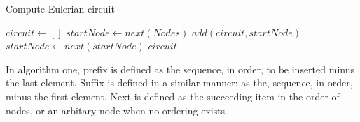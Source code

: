 \documentclass[letterpaper, 10 pt]{ieeeconf}
\begin{document}
  \begin{algorithm}
    \caption{Compute Eulerian circuit}
    \begin{algorithmic}
      \STATE $circuit \leftarrow []$
        \STATE $startNode \leftarrow next(Nodes)$
          \STATE $add(circuit, startNode)$
          \STATE $startNode \leftarrow next(startNode)$
        \ENDWHILE
      \ENDIF
      \RETURN $circuit$
    \end{algorithmic}
  \end{algorithm}

  In algorithm one, prefix is defined as the sequence, in order, to be inserted
  minus the last element.  Suffix is defined in a similar manner: as the,
  sequence, in order, minus the first element.  Next is defined as the
  succeeding item in the order of nodes, or an arbitary node when no ordering exists.
\end{document}
